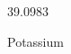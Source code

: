 \documentclass[12pt]{article}
\begin{document}
\hfill{}
\vfill
\begin{center}
  {\fontsize{50}{60}
  }

  39.0983

Potassium
\end{center}
\vfill
\end{document}
